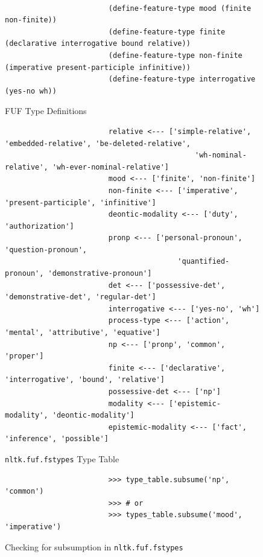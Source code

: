 \documentclass[12pt]{article}
\begin{document}
{\begin{figure}[h!]
    {\scriptsize
    \begin{verbatim}

                        (define-feature-type mood (finite non-finite))
                        (define-feature-type finite (declarative interrogative bound relative))
                        (define-feature-type non-finite (imperative present-participle infinitive))
                        (define-feature-type interrogative (yes-no wh))

    \end{verbatim}
    }
\caption{FUF Type Definitions}
\label{fig:fuf-type-table}
\end{figure}

\begin{figure}[h!]
    {\scriptsize
    \begin{verbatim}
                        relative <--- ['simple-relative', 'embedded-relative', 'be-deleted-relative', 
                                            'wh-nominal-relative', 'wh-ever-nominal-relative']
                        mood <--- ['finite', 'non-finite']
                        non-finite <--- ['imperative', 'present-participle', 'infinitive']
                        deontic-modality <--- ['duty', 'authorization']
                        pronp <--- ['personal-pronoun', 'question-pronoun', 
                                        'quantified-pronoun', 'demonstrative-pronoun']
                        det <--- ['possessive-det', 'demonstrative-det', 'regular-det']
                        interrogative <--- ['yes-no', 'wh']
                        process-type <--- ['action', 'mental', 'attributive', 'equative']
                        np <--- ['pronp', 'common', 'proper']
                        finite <--- ['declarative', 'interrogative', 'bound', 'relative']
                        possessive-det <--- ['np']
                        modality <--- ['epistemic-modality', 'deontic-modality']
                        epistemic-modality <--- ['fact', 'inference', 'possible']
    \end{verbatim}
    }
    \caption{\texttt{nltk.fuf.fstypes} Type Table}
\label{fig:nltk-type-table}
\end{figure}

\begin{figure}
    {\scriptsize
            \begin{verbatim}
                        >>> type_table.subsume('np', 'common')
                        >>> # or
                        >>> types_table.subsume('mood', 'imperative')
\end{verbatim}
}
\caption{Checking for subsumption in \texttt{nltk.fuf.fstypes}}
\label{fig:subsumption}
\end{figure}

}
\end{document}
